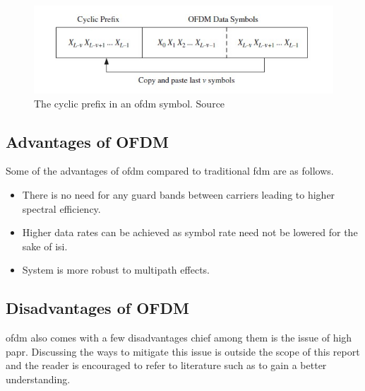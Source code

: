 \begin{figure}[!htbp]
\centering
\includegraphics[scale=1]{Chapter 2/Figures/Cyclic Prefix}
\caption[Cyclic Prefix]{The cyclic prefix in an \acrshort{ofdm} symbol. Source \textcite{Ghosh2010}}
\label{fig:ofdm cyclic prefix}
\end{figure}



\subsection{Advantages of OFDM}
Some of the advantages of \acrshort{ofdm} compared to traditional \acrshort{fdm} are as follows.
\begin{itemize}
\item There is no need for any guard bands between carriers leading to higher spectral efficiency.
\item Higher data rates can be achieved as symbol rate need not be lowered for the sake of \acrshort{isi}.
\item System is more robust to multipath effects.
\end{itemize}

\subsection{Disadvantages of OFDM}
\acrshort{ofdm} also comes with a few disadvantages chief among them is the issue of high \acrshort{papr}. Discussing the ways to mitigate this issue is outside the scope of this report and the reader is encouraged to refer to literature such as \textcite{Ghosh2010} to gain a better understanding.

